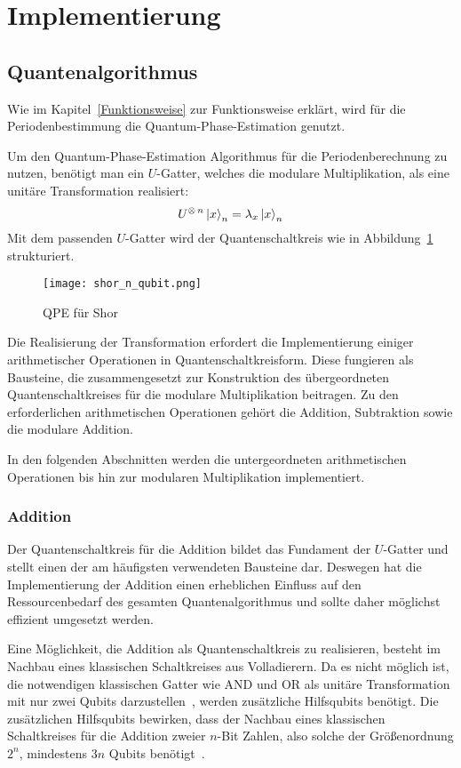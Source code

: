 \section{Implementierung} \label{sec:Implementierung}

\subsection{Quantenalgorithmus}
Wie im Kapitel~\ref{Funktionsweise} zur Funktionsweise erklärt,
wird für die Periodenbestimmung die Quantum-Phase-Estimation genutzt.

Um den Quantum-Phase-Estimation Algorithmus für die Periodenberechnung zu nutzen,
benötigt man ein \(U\)-Gatter, 
welches die modulare Multiplikation, 
als eine unitäre Transformation realisiert:
\[U^{\operatorname{\otimes} n}\ket{x}_n=\lambda_x\ket{x}_n\]
Mit dem passenden \(U\)-Gatter wird der Quantenschaltkreis wie in Abbildung~\ref{fig:shor_n_qubit} strukturiert.
\begin{figure}
    \centering
    \texttt{[image: shor\_n\_qubit.png]}
    \caption{QPE für Shor~\cite{anonymousket}}
    \label{fig:shor_n_qubit}
  \end{figure}

Die Realisierung der Transformation erfordert die Implementierung einiger arithmetischer Operationen in Quantenschaltkreisform. 
Diese fungieren als Bausteine, die zusammengesetzt zur Konstruktion des übergeordneten Quantenschaltkreises für die modulare Multiplikation beitragen. 
Zu den erforderlichen arithmetischen Operationen gehört die Addition, Subtraktion sowie die modulare Addition.

In den folgenden Abschnitten werden die untergeordneten arithmetischen Operationen bis hin zur modularen Multiplikation implementiert.

\subsubsection{Addition} \label{sec:QuantumAdder}
Der Quantenschaltkreis für die Addition bildet das Fundament der \(U\)-Gatter und 
stellt einen der am häufigsten verwendeten Bausteine dar. 
Deswegen hat die Implementierung der Addition einen erheblichen Einfluss auf den Ressourcenbedarf des gesamten Quantenalgorithmus
und sollte daher möglichst effizient umgesetzt werden.

Eine Möglichkeit, die Addition als Quantenschaltkreis zu realisieren, 
besteht im Nachbau eines klassischen Schaltkreises aus Volladierern. 
Da es nicht möglich ist, 
die notwendigen klassischen Gatter wie AND und OR als unitäre Transformation mit nur zwei Qubits darzustellen~\cite{Hoever2023QC},
werden zusätzliche Hilfsqubits benötigt.
Die zusätzlichen Hilfsqubits bewirken, dass der Nachbau eines klassischen Schaltkreises für die Addition zweier \(n\)-Bit Zahlen, 
also solche der Größenordnung \(2^n\), mindestens \(3n\) Qubits benötigt~\cite{zalka1998fast}.

